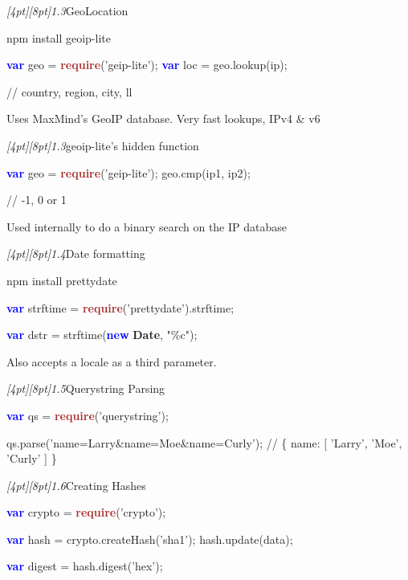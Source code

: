\documentclass{beamer}
\newcommand{\sn}[1]{\textrm{\textit{\Huge{\raisebox{-3pt}[4pt][8pt]{\textcolor{f2elblue}{#1}}}}}\hspace{4pt}}
\def\brown<#1>#2{\textcolor<#1>{brown}{\textbf<#1>{#2}}}
\def\green<#1>#2{\textcolor<#1>{dark-green}{\textbf<#1>{#2}}}
\def\blue<#1>#2{\textcolor<#1>{blue}{\textbf<#1>{#2}}}
\begin{document}
\begin{frame}[fragile]{\sn{1.3}GeoLocation}
\begin{semiverbatim}
  npm install geoip-lite

  \blue<1>{var} geo = \brown<1>{require}('geip-lite');
  \blue<1>{var} loc = geo.lookup(ip);

  // country, region, city, ll
\end{semiverbatim}
Uses MaxMind's GeoIP database.  Very fast lookups, IPv4 \& v6
\end{frame}

\begin{frame}[fragile]{\sn{1.3}geoip-lite's hidden function}
\begin{semiverbatim}
  \blue<1>{var} geo = \brown<1>{require}('geip-lite');
  geo.cmp(ip1, ip2);

  // -1, 0 or 1
\end{semiverbatim}
Used internally to do a binary search on the IP database
\end{frame}

\begin{frame}[fragile]{\sn{1.4}Date formatting}
\begin{semiverbatim}
  npm install prettydate

  \blue<1>{var} strftime = \brown<1>{require}('prettydate').strftime;

  \blue<1>{var} dstr = strftime(\blue<1>{new} \green<1>{Date}, "\%c");
\end{semiverbatim}
Also accepts a locale as a third parameter.
\end{frame}

\begin{frame}[fragile]{\sn{1.5}Querystring Parsing}
\begin{semiverbatim}
  \blue<1>{var} qs = \brown<1>{require}('querystring');

  qs.parse('name=Larry\&name=Moe\&name=Curly');
  // \{ name: [ 'Larry', 'Moe', 'Curly' ] \}
\end{semiverbatim}
\end{frame}

\begin{frame}[fragile]{\sn{1.6}Creating Hashes}
\begin{semiverbatim}
  \blue<1>{var} crypto = \brown<1>{require}('crypto');

  \blue<1>{var} hash = crypto.createHash('sha1');
  hash.update(data);

  \blue<1>{var} digest = hash.digest('hex');
\end{semiverbatim}
\end{frame}
\end{document}
